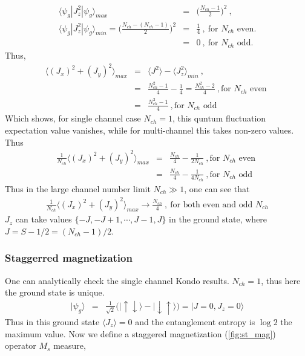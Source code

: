 \documentclass[reprint,prb,superscriptaddress]{revtex4-2}
\begin{document}
\begin{eqnarray}
\langle \psi_g | J_{z}^2 | \psi_g \rangle_{max} &=& \bigg(\frac{N_{ch}-1}{2}\bigg)^2~,\nonumber\\
\langle \psi_g | J_{z}^2 | \psi_g \rangle_{min} = \bigg(\frac{N_{ch}-(N_{ch}-1)}{2}\bigg)^2&=&\frac{1}{4}~,~\textrm{for $N_{ch}$ even}.\nonumber\\
&=& 0 ~,~\textrm{for $N_{ch}$ odd}.
\end{eqnarray}
Thus,
\begin{eqnarray}
\langle (J_x)^2+(J_y)^2 \rangle_{max}&=&\langle J^2 \rangle - \langle J_z^2 \rangle_{min} ~,\nonumber\\
&=& \frac{N_{ch}^2-1}{4}-\frac{1}{4}=\frac{N_{ch}^2-2}{4}~, \textrm{for $N_{ch}$ even } \nonumber\\
&=& \frac{N_{ch}^2-1}{4}~, \textrm{for $N_{ch}$ odd } \nonumber
\end{eqnarray}
Which shows, for single channel case $N_{ch}=1$, this quntum fluctuation expectation value vanishes, while for multi-channel this takes non-zero values. Thus 
\begin{eqnarray}
\frac{1}{N_{ch}}\langle (J_x)^2+(J_y)^2 \rangle_{max}
&=& \frac{N_{ch}}{4}-\frac{1}{2N_{ch}}  ~, \textrm{for $N_{ch}$ even } \nonumber\\
&=& \frac{N_{ch}}{4}-\frac{1}{4N_{ch}}~, \textrm{for $N_{ch}$ odd } \nonumber
\end{eqnarray}
Thus in the large channel number limit $N_{ch}\gg 1$, one can see that 
\begin{eqnarray}
\frac{1}{N_{ch}}\langle (J_x)^2+(J_y)^2 \rangle_{max}
\rightarrow \frac{N_{ch}}{4}~,~\textrm{for both even and odd $N_{ch}$}
\end{eqnarray}
\noindent $J_z$ can take values $\{-J,-J+1,\cdots,J-1,J\}$ in the ground state, where $J=S-1/2=(N_{ch}-1)/2$.




\subsubsection{Staggerred magnetization}
One can analytically check the single channel Kondo results. $N_{ch}=1$, thus here the ground state is unique.
\begin{eqnarray}
|\psi_g\rangle &=& \frac{1}{\sqrt{2}} \bigg(|\uparrow\downarrow\rangle-|\downarrow\uparrow\rangle\bigg)= |J=0,J_z=0\rangle
\end{eqnarray}
Thus in this ground state $\langle J_z \rangle=0$ and the  entanglement entropy is $\log 2$ the maximum value. Now we define a staggered magnetization (\ref{fig:st_mag}) operator $M_s$ measure,
\end{document}
